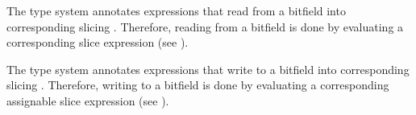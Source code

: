 The type system annotates expressions that read from a bitfield into corresponding slicing \rhsexpressions{}.
Therefore, reading from a bitfield is done by evaluating a corresponding slice expression (see ).

The type system annotates expressions that write to a bitfield into corresponding slicing \assignableexpressions{}.
Therefore, writing to a bitfield is done by evaluating a corresponding assignable slice expression (see ).
